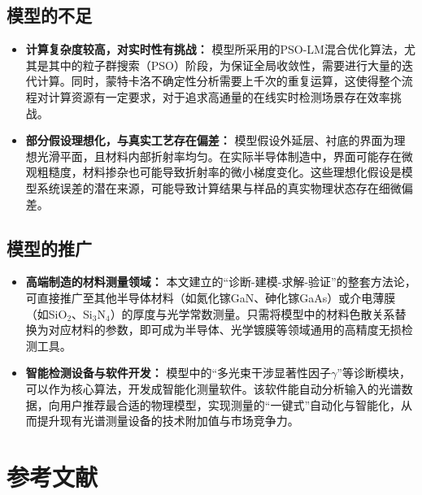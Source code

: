 \documentclass[withoutpreface,bwprint]{cumcmthesis} %
\begin{document}
\subsection{模型的不足}
\begin{itemize}
    \item \textbf{计算复杂度较高，对实时性有挑战：} 模型所采用的PSO-LM混合优化算法，尤其是其中的粒子群搜索（PSO）阶段，为保证全局收敛性，需要进行大量的迭代计算。同时，蒙特卡洛不确定性分析需要上千次的重复运算，这使得整个流程对计算资源有一定要求，对于追求高通量的在线实时检测场景存在效率挑战。

    \item \textbf{部分假设理想化，与真实工艺存在偏差：} 模型假设外延层、衬底的界面为理想光滑平面，且材料内部折射率均匀。在实际半导体制造中，界面可能存在微观粗糙度，材料掺杂也可能导致折射率的微小梯度变化。这些理想化假设是模型系统误差的潜在来源，可能导致计算结果与样品的真实物理状态存在细微偏差。
\end{itemize}

\subsection{模型的推广}
\begin{itemize}
    \item \textbf{高端制造的材料测量领域：} 本文建立的“诊断-建模-求解-验证”的整套方法论，可直接推广至其他半导体材料（如氮化镓GaN、砷化镓GaAs）或介电薄膜（如SiO$_2$、Si$_3$N$_4$）的厚度与光学常数测量。只需将模型中的材料色散关系替换为对应材料的参数，即可成为半导体、光学镀膜等领域通用的高精度无损检测工具。

    \item \textbf{智能检测设备与软件开发：} 模型中的“多光束干涉显著性因子$\gamma$”等诊断模块，可以作为核心算法，开发成智能化测量软件。该软件能自动分析输入的光谱数据，向用户推荐最合适的物理模型，实现测量的“一键式”自动化与智能化，从而提升现有光谱测量设备的技术附加值与市场竞争力。
\end{itemize}








\section{参考文献} %
\end{document}
